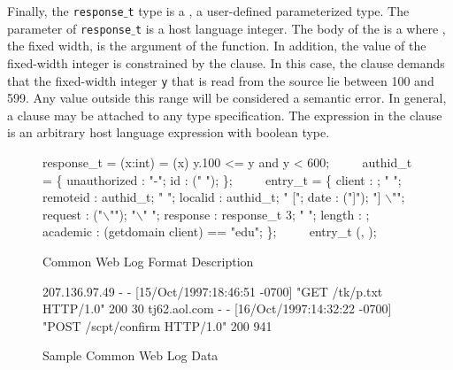Finally, the {\tt response$\_$t} type is a \Pfun, a user-defined
parameterized type.  The parameter of {\tt response$\_$t} is a host
language integer.  The body of the \Pfun{} is a 
where , the fixed width, is the argument of the function.  In
addition, the value of the fixed-width integer is constrained by the
\Pwhere{} clause.  In this case, the \Pwhere{} clause demands that
the fixed-width integer {\tt y} that is read from the source lie 
between 100 and 599.
Any value outside this range will be considered a semantic error.
In general, a \Pwhere{} clause may be attached to 
any type specification.  The expression in the \Pwhere{} clause
is an arbitrary host language expression with boolean type.


\begin{figure}

\begin{code}
response\_t =
  \Pfun(x:int) =
    (x) \Pwhere{} y.100 <= y and y < 600;
\(\qquad\)
authid\_t = \Punion{} \{
  unauthorized : "-";
  id           : \Pstring (" ");
\};
\(\qquad\)
entry\_t = \Pstruct{} \{
  client   : \Pip{};             " ";
  remoteid : authid\_t;        " ";
  localid  : authid\_t;        " [";
  date     : \Pdate("]");      "] \(\backslash\)"";
  request  : \Pstring("\(\backslash\)"");   "\(\backslash\)" ";
  response : response\_t 3;    " "; 
  length   : \Puint{};
  academic : \Pcompute 
              (getdomain client) == "edu";
\};
\(\qquad\)
entry\_t \Parray{}(\Peor, \Peof);
\end{code}

\caption{\ipads{} Common Web Log Format Description}
\label{fig:ipads-clf}

\end{figure}

\begin{figure*}
\begin{code}
 207.136.97.49 - - [15/Oct/1997:18:46:51 -0700] "GET /tk/p.txt HTTP/1.0" 200 30
 tj62.aol.com - - [16/Oct/1997:14:32:22 -0700] "POST /scpt/confirm HTTP/1.0" 200 941
\end{code}
\caption{Sample Common Web Log Data}
\label{fig:ipads-clf-data}

\end{figure*}



